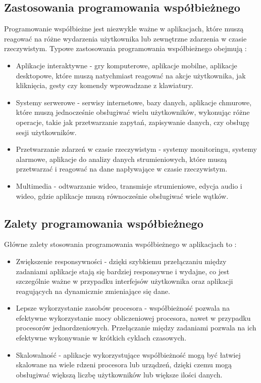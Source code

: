 \subsection{Zastosowania programowania współbieżnego}
Programowanie współbieżne jest niezwykle ważne w aplikacjach, które muszą reagować na różne wydarzenia użytkownika lub zewnętrzne zdarzenia w czasie rzeczywistym. Typowe zastosowania programowania współbieżnego obejmują \cite{ZastosowanieWspolbieznosci, ConcurrencyInAction}:
\begin{itemize}
    \item Aplikacje interaktywne - gry komputerowe, aplikacje mobilne, aplikacje desktopowe, które muszą natychmiast reagować na akcje użytkownika, jak kliknięcia, gesty czy komendy wprowadzane z klawiatury.
    \item Systemy serwerowe - serwisy internetowe, bazy danych, aplikacje chmurowe, które muszą jednocześnie obsługiwać wielu użytkowników, wykonując różne operacje, takie jak przetwarzanie zapytań, zapisywanie danych, czy obsługę sesji użytkowników.
    \item Przetwarzanie zdarzeń w czasie rzeczywistym - systemy monitoringu, systemy alarmowe, aplikacje do analizy danych strumieniowych, które muszą przetwarzać i reagować na dane napływające w czasie rzeczywistym.
    \item Multimedia - odtwarzanie wideo, transmisje strumieniowe, edycja audio i wideo, gdzie aplikacje muszą równocześnie obsługiwać wiele wątków.
\end{itemize}


\subsection{Zalety programowania współbieżnego}
Główne zalety stosowania programowania współbieżnego w aplikacjach to \cite{ProsAndCons, ConcurrencyInAction}:
\begin{itemize}
    \item Zwiększenie responsywności - dzięki szybkiemu przełączaniu między zadaniami aplikacje stają się bardziej responsywne i wydajne, co jest szczególnie ważne w przypadku interfejsów użytkownika oraz aplikacji reagujących na dynamicznie zmieniające się dane.
    \item Lepsze wykorzystanie zasobów procesora - współbieżność pozwala na efektywne wykorzystanie mocy obliczeniowej procesora, nawet w przypadku procesorów jednordzeniowych. Przełączanie między zadaniami pozwala na ich efektywne wykonywanie w krótkich cyklach czasowych.
    \item Skalowalność - aplikacje wykorzystujące współbieżność mogą być łatwiej skalowane na wiele rdzeni procesora lub urządzeń, dzięki czemu mogą obsługiwać większą liczbę użytkowników lub większe ilości danych.
\end{itemize}

